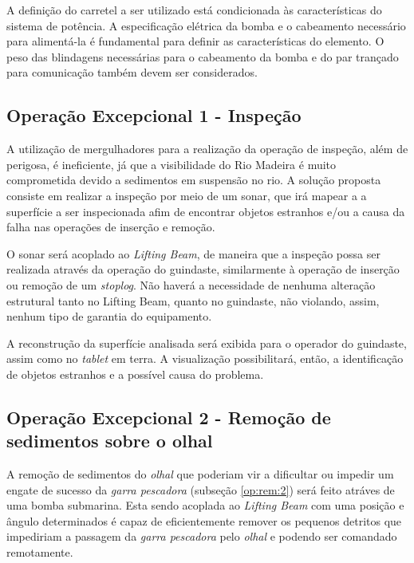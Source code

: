 A definição do carretel a ser utilizado está condicionada às características do
sistema de potência. A especificação elétrica da bomba e o cabeamento necessário
para alimentá-la é fundamental para definir as características do elemento. O
peso das blindagens necessárias para o cabeamento da bomba e do par trançado
para comunicação também devem ser considerados.

\subsection{Operação Excepcional 1 - Inspeção}
\label{sis:sol:1}
A utilização de mergulhadores para a realização da operação de inspeção, além de
perigosa, é ineficiente, já que a visibilidade do Rio Madeira é muito
comprometida devido a sedimentos em suspensão no rio. A solução proposta
consiste em realizar a inspeção por meio de um sonar, que irá mapear a a
superfície a ser inspecionada afim de encontrar objetos estranhos e/ou a causa
da falha nas operações de inserção e remoção.

O sonar será acoplado ao \emph{Lifting Beam}, de maneira que a inspeção possa
ser realizada através da operação do guindaste, similarmente à operação de
inserção ou remoção de um \emph{stoplog}. Não haverá a necessidade de nenhuma
alteração estrutural tanto no Lifting Beam, quanto no guindaste, não violando,
assim, nenhum tipo de garantia do equipamento.

A reconstrução da superfície analisada será exibida para o operador do
guindaste, assim como no \emph{tablet} em terra. A visualização possibilitará,
então, a identificação de objetos estranhos e a possível causa do problema.

\subsection{Operação Excepcional 2 - Remoção de sedimentos sobre o olhal}

A remoção de sedimentos do \emph{olhal} que poderiam vir a dificultar ou impedir
um engate de sucesso da \emph{garra pescadora} (subseção \ref{op:rem:2}) será
feito atráves de uma bomba submarina. Esta sendo acoplada ao \emph{Lifting
Beam} com uma posição e ângulo determinados é capaz de eficientemente remover os
pequenos detritos que impediriam a passagem da \emph{garra pescadora} pelo
\emph{olhal} e podendo ser comandado remotamente.
